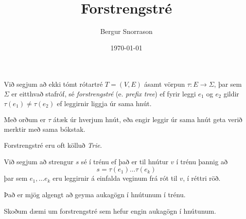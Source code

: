 \title{Forstrengstré}
\author{Bergur Snorrason}
\date{\today}



\frame{\titlepage}

{
	{
		\item<1-> Við segjum að ekki tómt rótartré $T = (V, E)$ ásamt vörpun $\tau \colon E \rightarrow \Sigma$,
					þar sem $\Sigma$ er eitthvað stafróf, sé \emph{forstrengstré} (e. \emph{prefix tree})
					ef fyrir leggi $e_1$ og $e_2$ gildir $\tau(e_1) \neq \tau(e_2)$ ef leggirnir liggja úr sama hnút.
		\item<2-> Með orðum er $\tau$ átæk úr hverjum hnút, eða engir leggir úr sama hnút geta verið merktir með sama bókstak.
		\item<3-> Forstrengstré eru oft kölluð \emph{Trie}.
		\item<4-> Við segjum að strengur $s$ sé í trénu ef það er til hnútur $v$ í trénu þannig að
						\[
							s = \tau(e_1) \dots \tau(e_k)
						\]
					þar sem $e_1, \dots e_k$ eru leggirnir á einfalda veginum frá rót til $v$, í réttri röð.
		\item<5-> Það er mjög algengt að geyma aukagögn í hnútunum í trénu.
		\item<6-> Skoðum dæmi um forstrengstré sem hefur engin aukagögn í hnútunum.
	}
}

